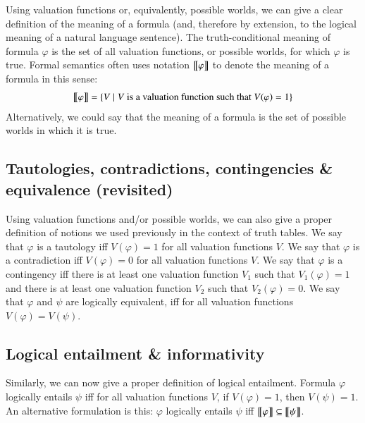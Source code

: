 \documentclass[nobib,nofonts]{tufte-handout}
\begin{document}
Using valuation functions or, equivalently, possible worlds, we can give a clear definition of the meaning of a formula (and, therefore by extension, to the logical meaning of a natural language sentence).
The truth-conditional meaning of formula $\varphi$ is the set of all valuation functions, or possible worlds, for which $\varphi$ is true.
Formal semantics often uses notation $\left [\! \left [ \varphi \right ]\! \right]$ to denote the meaning of a formula in this sense:
\begin{align*}
  \left [\! \left [ \varphi \right ]\! \right] = \left\{V \mid V \text{ is a valuation function such that } V(\varphi)=1 \right\}
\end{align*}
Alternatively, we could say that the meaning of a formula is the set of possible worlds in which it is true.

\subsection{Tautologies, contradictions, contingencies \& equivalence (revisited)}

Using valuation functions and/or possible worlds, we can also give a proper definition of notions we used previously in the context of truth tables.
We say that $\varphi$ is a tautology iff $V(\varphi) = 1$ for all valuation functions $V$.
We say that $\varphi$ is a contradiction iff $V(\varphi) = 0$ for all valuation functions $V$.
We say that $\varphi$ is a contingency iff there is at least one valuation function $V_{1}$ such that $V_{1}(\varphi) = 1$ and there is at least one valuation function $V_{2}$ such that $V_{2}(\varphi) = 0$.
We say that $\varphi$ and \(\psi\) are logically equivalent, iff for all valuation functions $V(\varphi) = V(\psi)$.


\subsection{Logical entailment \& informativity}

Similarly, we can now give a proper definition of logical entailment.
Formula $\varphi$ logically entails $\psi$ iff for all valuation functions $V$, if $V(\varphi)=1$, then $V(\psi)=1$.
An alternative formulation is this: $\varphi$ logically entails $\psi$ iff $\left [\! \left [ \varphi \right ]\! \right] \subseteq \left [\! \left [ \psi \right ]\! \right]$.
\end{document}
